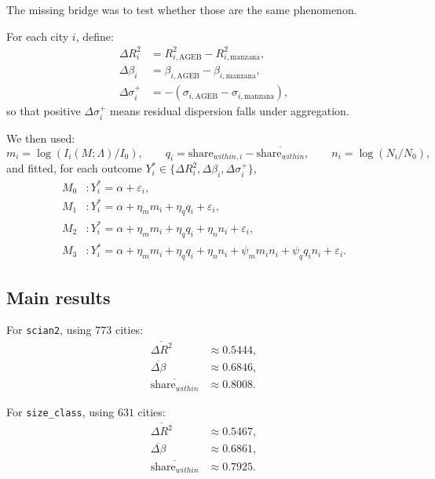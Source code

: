 \documentclass[11pt]{article}
\begin{document}
The missing bridge was to test whether those are the same phenomenon.

For each city \(i\), define:
\begin{align}
\Delta R_i^2 &= R^2_{i,\mathrm{AGEB}} - R^2_{i,\mathrm{manzana}},\\
\Delta \beta_i &= \beta_{i,\mathrm{AGEB}} - \beta_{i,\mathrm{manzana}},\\
\Delta \sigma_i^{+} &= -(\sigma_{i,\mathrm{AGEB}}-\sigma_{i,\mathrm{manzana}}),
\end{align}
so that positive \(\Delta \sigma_i^{+}\) means residual dispersion falls under aggregation.

We then used:
\begin{equation}
m_i = \log(I_i(M;\Lambda)/I_0),
\qquad
q_i = \text{share}_{within,i}-\overline{\text{share}_{within}},
\qquad
n_i=\log(N_i/N_0),
\end{equation}
and fitted, for each outcome \(Y_i^\ast\in\{\Delta R_i^2,\Delta\beta_i,\Delta\sigma_i^+\}\),
\begin{align}
M_0 &: Y_i^\ast = \alpha + \varepsilon_i,\\
M_1 &: Y_i^\ast = \alpha + \eta_m m_i + \eta_q q_i + \varepsilon_i,\\
M_2 &: Y_i^\ast = \alpha + \eta_m m_i + \eta_q q_i + \eta_n n_i + \varepsilon_i,\\
M_3 &: Y_i^\ast = \alpha + \eta_m m_i + \eta_q q_i + \eta_n n_i + \psi_m m_i n_i + \psi_q q_i n_i + \varepsilon_i.
\end{align}

\subsection{Main results}

For \texttt{scian2}, using \(773\) cities:
\begin{align}
\overline{\Delta R^2} &\approx 0.5444,\\
\overline{\Delta \beta} &\approx 0.6846,\\
\overline{\text{share}_{within}} &\approx 0.8008.
\end{align}

For \texttt{size\_class}, using \(631\) cities:
\begin{align}
\overline{\Delta R^2} &\approx 0.5467,\\
\overline{\Delta \beta} &\approx 0.6861,\\
\overline{\text{share}_{within}} &\approx 0.7925.
\end{align}
\end{document}
